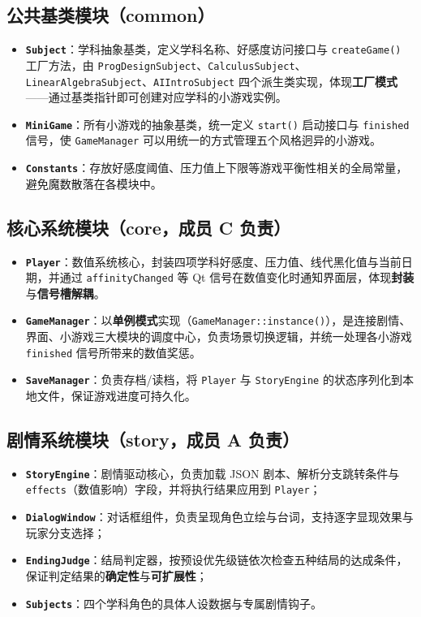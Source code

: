 \documentclass[12pt]{article}
\newcommand{\module}[1]{\texttt{#1}}
\begin{document}
\subsection{公共基类模块（common）}
\begin{itemize}[itemsep=3pt]
  \item \textbf{\module{Subject}}：学科抽象基类，定义学科名称、好感度访问接口与 \texttt{createGame()} 工厂方法，由 \module{ProgDesignSubject}、\allowbreak\module{CalculusSubject}、\allowbreak\module{LinearAlgebraSubject}、\allowbreak\module{AIIntroSubject} 四个派生类实现，体现\textbf{工厂模式}——通过基类指针即可创建对应学科的小游戏实例。
  \item \textbf{\module{MiniGame}}：所有小游戏的抽象基类，统一定义 \texttt{start()} 启动接口与 \texttt{finished} 信号，使 \module{GameManager} 可以用统一的方式管理五个风格迥异的小游戏。
  \item \textbf{\module{Constants}}：存放好感度阈值、压力值上下限等游戏平衡性相关的全局常量，避免魔数散落在各模块中。
\end{itemize}

\subsection{核心系统模块（core，成员 C 负责）}
\begin{itemize}[itemsep=3pt]
  \item \textbf{\module{Player}}：数值系统核心，封装四项学科好感度、压力值、线代黑化值与当前日期，并通过 \texttt{affinityChanged} 等 Qt 信号在数值变化时通知界面层，体现\textbf{封装}与\textbf{信号槽解耦}。
  \item \textbf{\module{GameManager}}：以\textbf{单例模式}实现（\texttt{GameManager::instance()}），是连接剧情、界面、小游戏三大模块的调度中心，负责场景切换逻辑，并统一处理各小游戏 \texttt{finished} 信号所带来的数值奖惩。
  \item \textbf{\module{SaveManager}}：负责存档/读档，将 \module{Player} 与 \module{StoryEngine} 的状态序列化到本地文件，保证游戏进度可持久化。
\end{itemize}

\subsection{剧情系统模块（story，成员 A 负责）}
\begin{itemize}[itemsep=3pt]
  \item \textbf{\module{StoryEngine}}：剧情驱动核心，负责加载 JSON 剧本、解析分支跳转条件与 \texttt{effects}（数值影响）字段，并将执行结果应用到 \module{Player}；
  \item \textbf{\module{DialogWindow}}：对话框组件，负责呈现角色立绘与台词，支持逐字显现效果与玩家分支选择；
  \item \textbf{\module{EndingJudge}}：结局判定器，按预设优先级链依次检查五种结局的达成条件，保证判定结果的\textbf{确定性}与\textbf{可扩展性}；
  \item \textbf{\module{Subjects}}：四个学科角色的具体人设数据与专属剧情钩子。
\end{itemize}
\end{document}
